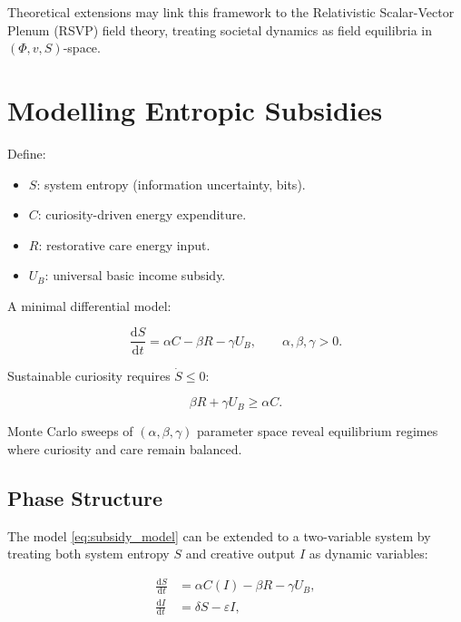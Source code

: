 \documentclass[12pt,a4paper]{article}
\theoremstyle{definition}
\newcommand{\ddt}[1]{\frac{\mathrm{d}#1}{\mathrm{d}t}}
\begin{document}
Theoretical extensions may link this framework to the Relativistic
Scalar-Vector Plenum (RSVP) field theory, treating societal dynamics as field
equilibria in $(\Phi, v, S)$-space.

\appendix

\section{Modelling Entropic Subsidies}
\label{app:entropic}

Define:
\begin{itemize}[leftmargin=*]
  \item $S$: system entropy (information uncertainty, bits).
  \item $C$: curiosity-driven energy expenditure.
  \item $R$: restorative care energy input.
  \item $U_B$: universal basic income subsidy.
\end{itemize}

A minimal differential model:

\begin{equation}
  \ddt{S} = \alpha C - \beta R - \gamma U_B,
  \qquad \alpha, \beta, \gamma > 0.
  \label{eq:subsidy_model}
\end{equation}

Sustainable curiosity requires $\dot{S} \leq 0$:

\begin{equation}
  \beta R + \gamma U_B \geq \alpha C.
\end{equation}

Monte Carlo sweeps of $(\alpha, \beta, \gamma)$ parameter space reveal
equilibrium regimes where curiosity and care remain balanced.

\subsection*{Phase Structure}

The model \eqref{eq:subsidy_model} can be extended to a two-variable system
by treating both system entropy $S$ and creative output $I$ as dynamic
variables:

\begin{align}
  \ddt{S} &= \alpha C(I) - \beta R - \gamma U_B, \label{eq:S_dyn}\\
  \ddt{I} &= \delta S - \varepsilon I, \label{eq:I_dyn}
\end{align}
\end{document}

